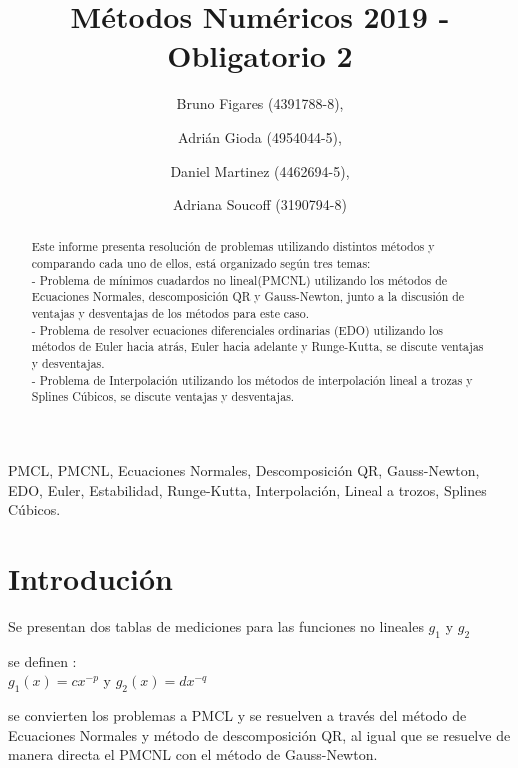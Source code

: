 \documentclass{endm}
\begin{document}
\begin{frontmatter}

\title{Métodos Numéricos 2019 - Obligatorio 2}

\author{Bruno Figares (4391788-8),}
\author{Adrián Gioda (4954044-5),}
\author{Daniel Martinez (4462694-5),}
\author{Adriana Soucoff (3190794-8)}

\address{Instituto de Matem\'atica y Estad\'istica\\ Facultad de Ingenier\'ia. Universidad de la Rep\'ublica\\ Montevideo, Uruguay}


\begin{abstract}
\setlength{\parindent}{12pt}
Este informe presenta resolución de problemas utilizando distintos métodos y comparando cada uno de ellos, está organizado según tres temas:\\
    - Problema de mínimos cuadardos no lineal(PMCNL) utilizando los métodos de Ecuaciones Normales, descomposición QR y Gauss-Newton, junto a la discusión de ventajas y desventajas de los métodos para este caso.\\
    - Problema de resolver ecuaciones diferenciales ordinarias (EDO) utilizando los métodos de Euler hacia atrás, Euler hacia adelante y Runge-Kutta, se discute ventajas y desventajas.\\
    - Problema de Interpolación utilizando los métodos de interpolación lineal a trozas y Splines Cúbicos, se discute ventajas y desventajas.
\end{abstract}

\begin{keyword}
PMCL, PMCNL, Ecuaciones Normales, Descomposición QR, Gauss-Newton, EDO, Euler, Estabilidad, Runge-Kutta, Interpolación, Lineal a trozos, Splines Cúbicos.
\end{keyword}
\end{frontmatter}

\section{Introdución}\label{intro}
Se presentan dos tablas de mediciones para las funciones no lineales $g_1$ y $g_2$ 


se definen :\\
$g_1(x)=c x^{-p} $ y $g_2(x)=d x^{-q} $

se convierten los problemas a PMCL y se resuelven a través del método de Ecuaciones Normales y método de descomposición QR, al igual que se resuelve de manera directa el PMCNL con el método de Gauss-Newton.
\end{document}
